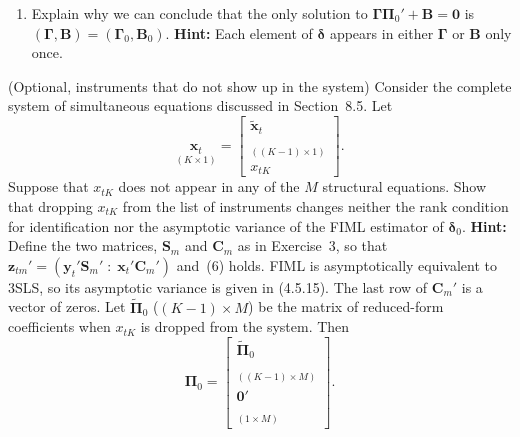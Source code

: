 \begin{problemset}
\begin{enumerate}[label=(\alph*)]
\item Explain why we can conclude that the only solution to $\boldsymbol{\Gamma}\boldsymbol{\Pi}_0' + \mathbf{B} = \mathbf{0}$ is
  $(\boldsymbol{\Gamma}, \mathbf{B}) = (\boldsymbol{\Gamma}_0, \mathbf{B}_0)$.
  \textbf{Hint:} Each element of $\boldsymbol{\delta}$ appears in either $\boldsymbol{\Gamma}$ or $\mathbf{B}$ only
  once.
\end{enumerate}

\exercise[4]
(Optional, instruments that do not show up in the system)\quad
Consider the complete system of simultaneous equations discussed in Section~8.5. Let
\[
  \underset{(K \times 1)}{\mathbf{x}_t}
  = \begin{bmatrix}
      \tilde{\mathbf{x}}_t \\
      \underset{((K-1) \times 1)}{\phantom{x}} \\
      x_{tK}
    \end{bmatrix}.
\]
Suppose that $x_{tK}$ does not appear in any of the $M$ structural equations. Show
that dropping $x_{tK}$ from the list of instruments changes neither the rank condition for identification nor the asymptotic variance of the FIML estimator
of $\boldsymbol{\delta}_0$. \textbf{Hint:} Define the two matrices, $\mathbf{S}_m$ and $\mathbf{C}_m$ as in Exercise~3, so that
$\mathbf{z}_{tm}' = (\mathbf{y}_t'\mathbf{S}_m' \;:\; \mathbf{x}_t'\mathbf{C}_m')$
and~(6) holds. FIML is asymptotically equivalent to 3SLS,
so its asymptotic variance is given in (4.5.15). The last row of $\mathbf{C}_m'$ is a vector of
zeros. Let $\tilde{\boldsymbol{\Pi}}_0$ ($(K-1) \times M$) be the matrix of reduced-form coefficients when
$x_{tK}$ is dropped from the system. Then
\[
  \boldsymbol{\Pi}_0
  = \begin{bmatrix}
      \tilde{\boldsymbol{\Pi}}_0 \\
      \underset{((K-1) \times M)}{\phantom{x}} \\
      \mathbf{0}' \\
      \underset{(1 \times M)}{\phantom{x}}
    \end{bmatrix}.
\]

\end{problemset}
